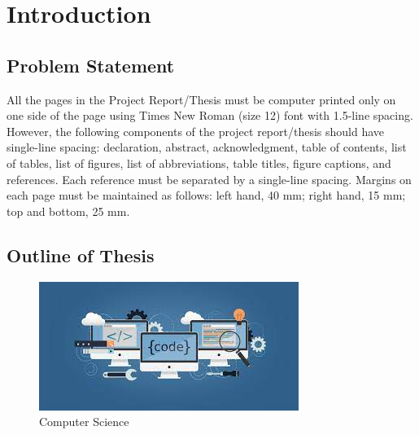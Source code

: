 \chapter{Introduction}  %



\section{Problem Statement} %

 

 

All the pages in the Project Report/Thesis must be computer printed only on one side of the page using
Times New Roman (size 12) font with 1.5-line spacing.
However, the following components of the project report/thesis should have single-line spacing: declaration, abstract, acknowledgment, table of contents, list of tables, list of figures, list of abbreviations, table titles, figure captions, and references. 
Each reference must be separated by a single-line spacing. Margins on each page must be maintained as
follows: left hand, 40 mm; right hand, 15 mm; top and bottom, 25 mm.  
\citep{Streftaris2004} 

\section{Outline of Thesis}
\begin{figure}[h!]
  \includegraphics[width=\linewidth]{images/image.jpg}
  \caption{Computer Science}
  \label{fig: computer science}
\end{figure}
 
